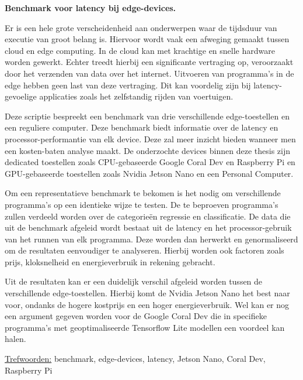 \textbf{Benchmark voor latency bij edge-devices.}

Er is een hele grote verscheidenheid aan onderwerpen waar de tijdsduur van executie van groot belang is. Hiervoor wordt vaak een afweging gemaakt tussen cloud en edge computing. In de cloud kan met krachtige en snelle hardware worden gewerkt. Echter treedt hierbij een significante vertraging op, veroorzaakt door het verzenden van data over het internet. Uitvoeren van programma's in de edge hebben geen last van deze vertraging. Dit kan voordelig zijn bij latency-gevoelige applicaties zoals het zelfstandig rijden van voertuigen. 

Deze scriptie bespreekt een benchmark van drie verschillende edge-toestellen en een reguliere computer. Deze benchmark biedt informatie over de latency en processor-performantie van elk device. Deze zal meer inzicht bieden wanneer men een kosten-baten analyse maakt. De onderzochte devices binnen deze thesis zijn dedicated toestellen zoals CPU-gebaseerde Google Coral Dev en Raspberry Pi en GPU-gebaseerde toestellen zoals Nvidia Jetson Nano en een Personal Computer.

Om een representatieve benchmark te bekomen is het nodig om verschillende programma's op een identieke wijze te testen. De te beproeven programma's zullen verdeeld worden over de categorie\"en regressie en classificatie. De data die uit de benchmark afgeleid wordt bestaat uit de latency en het processor-gebruik van het runnen van elk programma. Deze worden dan herwerkt en genormaliseerd om de resultaten eenvoudiger te analyseren. Hierbij worden ook factoren zoals prijs, kloksnelheid en energieverbruik in rekening gebracht.

Uit de resultaten kan er een duidelijk verschil afgeleid worden tussen de verschillende edge-toestellen. Hierbij komt de Nvidia Jetson Nano het best naar voor, ondanks de hogere kostprijs en een hoger energieverbruik. Wel kan er nog een argument gegeven worden voor de Google Coral Dev die in specifieke programma's met geoptimaliseerde Tensorflow Lite modellen een voordeel kan halen.

\underline{Trefwoorden:} benchmark, edge-devices, latency, Jetson Nano, Coral Dev, Raspberry Pi